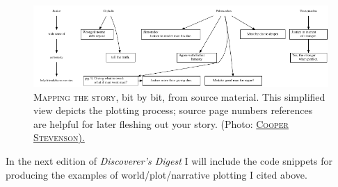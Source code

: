 \begin{figure}[h]
 \includegraphics[width=\linewidth]{./media/images/conv_short.pdf}%
  \small{\textsc{\\ Mapping the story}, bit by bit, from source material. This
    simplified view depicts the plotting process; source
    page numbers references are helpful for
    later fleshing out your story. (Photo: \href{http://portfolio.cooper.stevenson.name}{\textsc{Cooper Stevenson}).}}
\end{figure}

In the next edition of \textit{Discoverer's Digest} I will include the code
snippets for producing the examples of world/plot/narrative plotting I cited
above.

